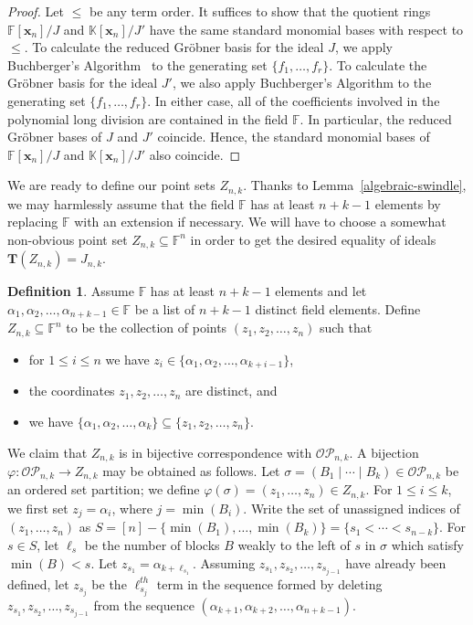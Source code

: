 \documentclass[10pt]{amsart}
\theoremstyle{definition}
\newtheorem{defn}[theorem]{Definition}
\newcommand{\OP}{{\mathcal{OP}}}
\newcommand{\FF}{{\mathbb{F}}}
\newcommand{\KK}{{\mathbb{K}}}
\newcommand{\xx}{{\mathbf {x}}}
\newcommand{\TT}{{\mathbf {T}}}
\begin{document}
\begin{proof}
Let $\leq$ be any term order.
It suffices to show that the quotient rings ${\FF[\xx_n]} / {J}$ and ${\KK[\xx_n]} / {J'}$ have the same 
standard monomial bases with respect to $\leq$.  
To calculate the reduced Gr\"obner basis for the ideal $J$, we apply Buchberger's Algorithm~\cite[Ch. 2, \S7]{CLO} 
to the generating set $\{f_1, \dots, f_r\}$.   
To calculate the Gr\"obner basis for the ideal $J'$, we also apply Buchberger's Algorithm to the generating set
$\{f_1, \dots, f_r\}$.  In either case, all of the coefficients involved in the polynomial long division are contained in the
field $\FF$.  In particular, the reduced Gr\"obner bases of $J$ and $J'$ coincide.  Hence, the standard monomial
bases of ${\FF[\xx_n]} / {J}$ and ${\KK[\xx_n]} / {J'}$ also coincide.
\end{proof}

We are ready to define our point sets $Z_{n,k}$.  Thanks to Lemma~\ref{algebraic-swindle}, we may harmlessly
assume that 
the field $\FF$ has at least $n+k-1$ elements by replacing $\FF$ with an extension if necessary.
We will have to choose a somewhat non-obvious point set $Z_{n,k} \subseteq \FF^n$ in order to get the 
desired equality of ideals $\TT(Z_{n,k}) = J_{n,k}$.

\begin{defn}
Assume $\FF$ has at least $n+k-1$ elements and let $\alpha_1, \alpha_2, \dots, \alpha_{n+k-1} \in \FF$
be a list of $n+k-1$ distinct field elements.  Define $Z_{n,k} \subseteq \FF^n$ to be the collection of points
$(z_1, z_2, \dots, z_n)$ such that
\begin{itemize}
\item  for $1 \leq i \leq n$ we have $z_i \in \{\alpha_1, \alpha_2, \dots, \alpha_{k+i-1} \}$,
\item the coordinates $z_1, z_2, \dots, z_n$ are distinct, and
\item  we have $\{\alpha_1, \alpha_2, \dots, \alpha_k\} \subseteq \{z_1, z_2, \dots, z_n\}$.
\end{itemize}
\end{defn}

We claim that $Z_{n,k}$ is in bijective correspondence with $\OP_{n,k}$.  A bijection
$\varphi: \OP_{n,k} \rightarrow Z_{n,k}$ may be obtained as follows.
Let $\sigma = (B_1 \mid \cdots \mid B_k) \in \OP_{n,k}$ be an ordered set partition;
we define $\varphi(\sigma) = (z_1, \dots, z_n) \in Z_{n,k}$.
For $1 \leq i \leq k$, we first set $z_j = \alpha_i$, where $j = \min(B_i)$.  
Write the set of unassigned indices of
$(z_1, \dots, z_n)$ as  $S = [n] - \{\min(B_1), \dots, \min(B_k)\} = \{s_1 < \cdots < s_{n-k} \}$.
For $s \in S$, let $\ell_s$ be the number of blocks $B$ weakly to the left of $s$ in $\sigma$ which 
satisfy $\min(B) < s$.
Let $z_{s_1} = \alpha_{k + \ell_{s_1}}$.  Assuming $z_{s_1}, z_{s_2}, \dots, z_{s_{j-1}}$ have already 
been defined, let $z_{s_j}$ be the $\ell_{s_j}^{th}$ term in the sequence formed by deleting
$z_{s_1}, z_{s_2}, \dots, z_{s_{j-1}}$ from the sequence
$(\alpha_{k+1}, \alpha_{k+2}, \dots, \alpha_{n+k-1})$.
\end{document}
